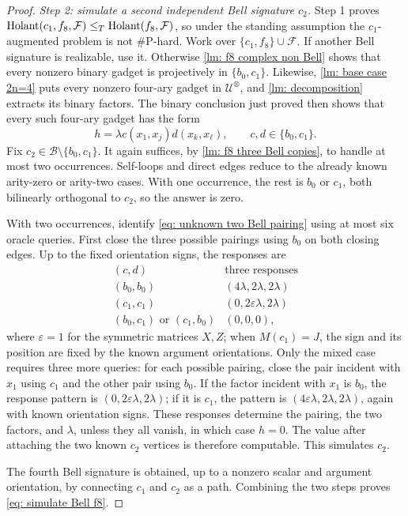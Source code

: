 \begin{proof}
\emph{Step 2: simulate a second independent Bell signature $c_2$.}
Step 1 proves
$\operatorname{Holant}(c_1,f_8,\mathcal F)\leq_T\operatorname{Holant}(f_8,\mathcal F)$, so under the
standing assumption the $c_1$-augmented problem is not \#P-hard.  Work
over $\{c_1,f_8\}\cup\mathcal F$.  If another Bell signature is
realizable, use it.  Otherwise \cref{lm: f8 complex non Bell} shows that
every nonzero binary gadget is projectively in $\{b_0,c_1\}$.  Likewise,
\cref{lm: base case 2n=4} puts every nonzero four-ary gadget in
$\mathcal U^{\otimes}$, and \cref{lm: decomposition} extracts its binary
factors.  The binary conclusion just proved then shows that every such
four-ary gadget has the form
\begin{equation}
 h=\lambda c(x_1,x_j)d(x_k,x_\ell),
 \qquad c,d\in\{b_0,c_1\}.
 \label{eq: unknown two Bell pairing}
\end{equation}
Fix $c_2\in\mathcal B\setminus\{b_0,c_1\}$.  It again suffices, by
\cref{lm: f8 three Bell copies}, to handle at most two occurrences.
Self-loops and direct edges reduce to the already known arity-zero or
arity-two cases.  With one occurrence, the rest is $b_0$ or $c_1$, both
bilinearly orthogonal to $c_2$, so the answer is zero.

With two occurrences, identify \eqref{eq: unknown two Bell pairing} using
at most six oracle queries.  First close the three possible pairings using
$b_0$ on both closing edges.  Up to the fixed orientation signs, the
responses are
\[
\begin{array}{c|c}
(c,d)&\text{three responses}\\ \hline
(b_0,b_0)&(4\lambda,2\lambda,2\lambda)\\
(c_1,c_1)&(0,2\varepsilon\lambda,2\lambda)\\
(b_0,c_1)\text{ or }(c_1,b_0)&(0,0,0),
\end{array}
\]
where $\varepsilon=1$ for the symmetric matrices $X,Z$; when
$M(c_1)=J$, the sign and its position are fixed by the known argument
orientations.  Only the mixed case requires three more queries: for each
possible pairing, close the pair incident with $x_1$ using $c_1$ and the
other pair using $b_0$.  If the factor incident with $x_1$ is $b_0$, the
response pattern is $(0,2\varepsilon\lambda,2\lambda)$; if it is $c_1$,
the pattern is $(4\varepsilon\lambda,2\lambda,2\lambda)$, again with known
orientation signs.  These responses determine the pairing, the two
factors, and $\lambda$, unless they all vanish, in which case $h=0$.
The value after attaching the two known $c_2$ vertices is therefore
computable.  This simulates $c_2$.

The fourth Bell signature is obtained, up to a nonzero scalar and argument
orientation, by connecting $c_1$ and $c_2$ as a path.  Combining the two
steps proves \eqref{eq: simulate Bell f8}.
\end{proof}

